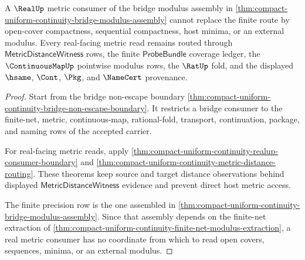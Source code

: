 \begin{theorem}
\label{thm:compact-uniform-continuity-real-metric-seal-nonescape}
A $\RealUp$ metric consumer of the bridge modulus assembly in \autoref{thm:compact-uniform-continuity-bridge-modulus-assembly} cannot replace the finite route by open-cover compactness, sequential compactness, host minima, or an external modulus. Every real-facing metric read remains routed through $\mathsf{MetricDistanceWitness}$ rows, the finite $\mathsf{ProbeBundle}$ coverage ledger, the $\ContinuousMapUp$ pointwise modulus rows, the $\RatUp$ fold, and the displayed $\hsame$, $\Cont$, $\Pkg$, and $\NameCert$ provenance.
\end{theorem}
\begin{proof}
Start from the bridge non-escape boundary \autoref{thm:compact-uniform-continuity-bridge-non-escape-boundary}. It restricts a bridge consumer to the finite-net, metric, continuous-map, rational-fold, transport, continuation, package, and naming rows of the accepted carrier.

For real-facing metric reads, apply \autoref{thm:compact-uniform-continuity-realup-consumer-boundary} and \autoref{thm:compact-uniform-continuity-metric-distance-routing}. These theorems keep source and target distance observations behind displayed $\mathsf{MetricDistanceWitness}$ evidence and prevent direct host metric access.

The finite precision row is the one assembled in \autoref{thm:compact-uniform-continuity-bridge-modulus-assembly}. Since that assembly depends on the finite-net extraction of \autoref{thm:compact-uniform-continuity-finite-net-modulus-extraction}, a real metric consumer has no coordinate from which to read open covers, sequences, minima, or an external modulus.
\end{proof}

